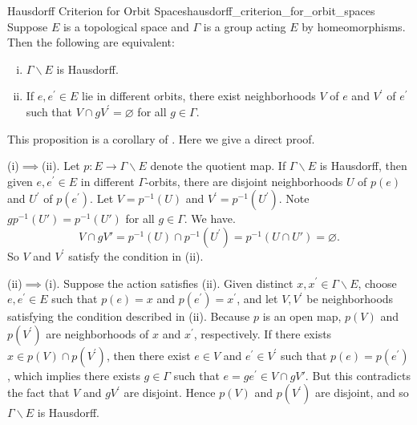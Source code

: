 \documentclass{report}
\begin{document}
\begin{proposition}{Hausdorff Criterion for Orbit Spaces}{hausdorff_criterion_for_orbit_spaces}
	 Suppose $E$ is a topological space and $\Gamma$ is a group acting $E$ by homeomorphisms. Then the following are equivalent:
	 \begin{enumerate}[(i)]
		\item $\Gamma \backslash E$ is Hausdorff.
		\item If $e, e^{\prime} \in E$ lie in different orbits, there exist neighborhoods $V$
		of $e$ and $V^{\prime}$ of $e^{\prime}$ such that $V \cap g  V^{\prime} =\varnothing$ for all $g \in \Gamma$.
	\end{enumerate}
\end{proposition}
\begin{prf}
	This proposition is a corollary of . Here we give a direct proof.

	(i)$\implies$(ii). Let $p: E \rightarrow \Gamma\backslash E$ denote the quotient map. If $\Gamma\backslash E$ is Hausdorff, then given $e, e^{\prime}\in E$ in different $\Gamma$-orbits, there are disjoint neighborhoods $U$ of $p(e)$ and $U^{\prime}$ of $p\left(e^{\prime}\right)$. Let $V=p^{-1}(U)$ and $V^{\prime}=p^{-1}\left(U^{\prime}\right)$. Note $g p^{-1}(U')=p^{-1}(U')$ for all $g \in \Gamma$. We have.
	\[
		V\cap gV'= p^{-1}(U)\cap p^{-1}\left(U^{\prime}\right)=p^{-1}\left(U\cap U'\right)=\varnothing.
	\]
	So $V$ and $V^{\prime}$ satisfy the condition in (ii).

	(ii)$\implies$(i). Suppose the action satisfies (ii). Given distinct $x, x^{\prime} \in\Gamma\backslash E$, choose $e, e^{\prime} \in E$ such that $p(e)=x$ and $p\left(e^{\prime}\right)=x^{\prime}$, and let $V, V^{\prime}$ be neighborhoods satisfying the condition described in (ii). Because $p$ is an open map, $p(V)$ and $p\left(V^{\prime}\right)$ are neighborhoods of $x$ and $x^{\prime}$, respectively. If there exists $x\in p(V)\cap p\left(V^{\prime}\right)$, then there exist $e\in V$ and $e^{\prime}\in V^{\prime}$ such that $p(e)=p\left(e^{\prime}\right)$, which implies there exists $g\in \Gamma$ such that $e=g e^{\prime}\in V\cap gV'$. But this contradicts the fact that $V$ and $gV^{\prime}$ are disjoint. Hence $p(V)$ and $p\left(V^{\prime}\right)$ are disjoint, and so $\Gamma\backslash E$ is Hausdorff.
\end{prf}
\end{document}
